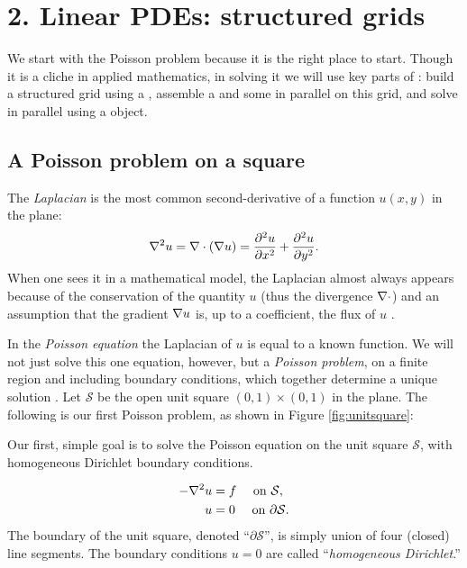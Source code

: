 
\chapter{2. Linear PDEs: structured grids}

We start with the Poisson problem because it is the right place to start.  Though it is a cliche in applied mathematics, in solving it we will use key parts of \PETSc: build a structured grid using a \PETSc \pDMDA, assemble a \pMat and some \pVecs in parallel on this grid, and solve in parallel using a \pKSP object.

\section{A Poisson problem on a square}

The \emph{Laplacian} is the most common second-derivative of a function $u(x,y)$ in the plane:
    $$\nabla^2 u = \nabla\cdot(\nabla u) = \frac{\partial^2 u}{\partial x^2} + \frac{\partial^2 u}{\partial y^2}.$$
When one sees it in a mathematical model, the Laplacian almost always appears because of the conservation of the quantity $u$ (thus the divergence $\nabla\cdot$) and an assumption that the gradient $\nabla u$ is, up to a coefficient, the flux of $u$ \citep{Ockendonetal2003}.  

In the \emph{Poisson equation} the Laplacian of $u$ is equal to a known function.  We will not just solve this one equation, however, but a \emph{Poisson problem}, on a finite region and including boundary conditions, which together determine a unique solution \citep{Evans}.  Let $\mathcal{S}$ be the open unit square $(0,1)\times(0,1)$ in the plane.  The following is our first Poisson problem, as shown in Figure \ref{fig:unitsquare}:
\begin{marginfigure}
\caption{Our first, simple goal is to solve the Poisson equation on the unit square $\mathcal{S}$, with homogeneous Dirichlet boundary conditions.}
\label{fig:unitsquare}
\end{marginfigure}
\begin{align}
- \nabla^2 u &= f \quad \text{ on } \mathcal{S}, \label{poissonsquare} \\
u &= 0 \quad \text{ on } \partial \mathcal{S}. \notag
\end{align}
The boundary of the unit square, denoted ``$\partial\mathcal{S}$'', is simply union of four (closed) line segments.  The boundary conditions $u=0$ are called ``\emph{homogeneous Dirichlet}.''

